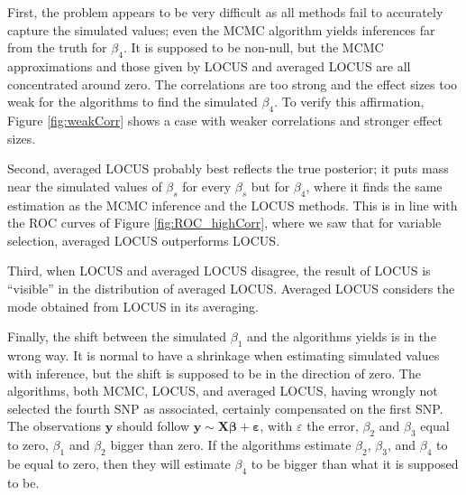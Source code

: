 \documentclass[a4paper, 11pt]{report}
\numberwithin{equation}{chapter}
\begin{document}
First, the problem appears to be very difficult as all methods  fail to accurately capture the simulated values; even the MCMC algorithm yields inferences far from the truth for $\beta_4$. It is supposed to be non-null, but the MCMC approximations and those given by LOCUS and averaged LOCUS are all concentrated around zero. The correlations are too strong and the effect sizes too weak for the algorithms to find the simulated $\beta_4$. To verify this affirmation, Figure \ref{fig:weakCorr} shows a case with weaker correlations and stronger effect sizes.

Second, averaged LOCUS probably best reflects the true posterior; it puts mass near the simulated values of $\beta_s$ for every $\beta_s$ but for $\beta_4$, where it finds the same estimation as the MCMC inference and the LOCUS methods. This is in line with the ROC curves of Figure \ref{fig:ROC_highCorr}, where we saw that for variable selection, averaged LOCUS outperforms LOCUS.

Third, when LOCUS and averaged LOCUS disagree, the result of LOCUS is ``visible'' in the distribution of averaged LOCUS. Averaged LOCUS considers the mode obtained from LOCUS in its averaging.

Finally, the shift between the simulated $\beta_1$ and the algorithms yields is in the wrong way. It is normal to have a shrinkage when estimating simulated values with inference, but the shift is supposed to be in the direction of zero. The algorithms, both MCMC, LOCUS, and averaged LOCUS, having wrongly not selected the fourth SNP as associated, certainly compensated on the first SNP. The observations $\boldsymbol{y}$ should follow $\boldsymbol{y} \sim \boldsymbol{X}\boldsymbol{\beta} + \boldsymbol{\varepsilon}$, with $\varepsilon$ the error, $\beta_2$ and $\beta_3$ equal to zero, $\beta_1$ and $\beta_2$ bigger than zero. If the algorithms estimate $\beta_2$, $\beta_3$, and $\beta_4$ to be equal to zero, then they will estimate $\beta_4$ to be bigger than what it is supposed to be.
\end{document}
